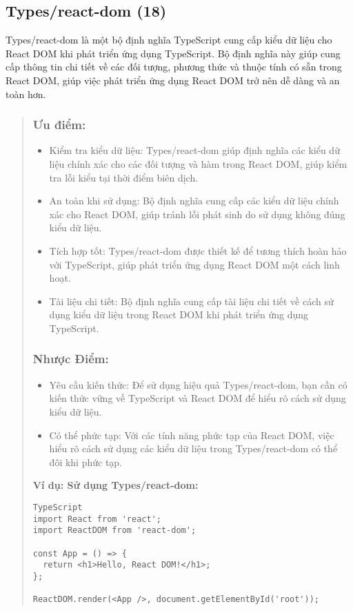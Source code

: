 \subsection{Types/react-dom (18)}

Types/react-dom là một bộ định nghĩa TypeScript cung cấp kiểu dữ liệu cho React DOM khi phát triển ứng dụng TypeScript. Bộ định nghĩa này giúp cung cấp thông tin chi tiết về các đối tượng, phương thức và thuộc tính có sẵn trong React DOM, giúp việc phát triển ứng dụng React DOM trở nên dễ dàng và an toàn hơn.

\begin{quote}
\subsubsection{Ưu điểm:}
\begin{itemize}
  \item Kiểm tra kiểu dữ liệu: Types/react-dom giúp định nghĩa các kiểu dữ liệu chính xác cho các đối tượng và hàm trong React DOM, giúp kiểm tra lỗi kiểu tại thời điểm biên dịch.
  \item An toàn khi sử dụng: Bộ định nghĩa cung cấp các kiểu dữ liệu chính xác cho React DOM, giúp tránh lỗi phát sinh do sử dụng không đúng kiểu dữ liệu.
  \item Tích hợp tốt: Types/react-dom được thiết kế để tương thích hoàn hảo với TypeScript, giúp phát triển ứng dụng React DOM một cách linh hoạt.
  \item Tài liệu chi tiết: Bộ định nghĩa cung cấp tài liệu chi tiết về cách sử dụng kiểu dữ liệu trong React DOM khi phát triển ứng dụng TypeScript.
\end{itemize}

\subsubsection{Nhược Điểm:}
\begin{itemize}
  \item Yêu cầu kiến thức: Để sử dụng hiệu quả Types/react-dom, bạn cần có kiến thức vững về TypeScript và React DOM để hiểu rõ cách sử dụng kiểu dữ liệu.
  \item Có thể phức tạp: Với các tính năng phức tạp của React DOM, việc hiểu rõ cách sử dụng các kiểu dữ liệu trong Types/react-dom có thể đôi khi phức tạp.
\end{itemize}

\textbf{Ví dụ: Sử dụng Types/react-dom:}
\begin{lstlisting}
TypeScript
import React from 'react';
import ReactDOM from 'react-dom';

const App = () => {
  return <h1>Hello, React DOM!</h1>;
};

ReactDOM.render(<App />, document.getElementById('root'));
\end{lstlisting}
\end{quote}




